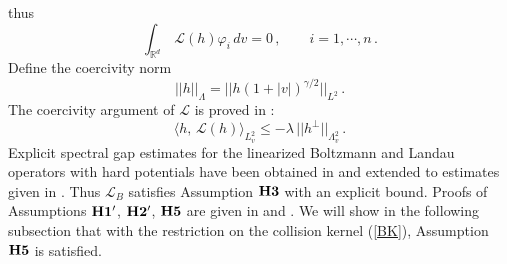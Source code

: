 \documentclass[final,onefignum,onetabnum]{siamart171218}
\begin{document}
thus \begin{equation}\label{LN} \int_{\mathbb R^d}\, \mathcal L(h) \varphi_i\, dv=0\,, \qquad i=1, \cdots, n\,.  \end{equation}
Define the coercivity norm $$||h||_{\Lambda}=||h(1+|v|)^{\gamma/2}||_{L^2}\,.$$
The coercivity argument of $\mathcal L$ is proved in \cite{MC}:
\begin{equation}
\label{CoerB} \langle h, \, \mathcal L(h)\rangle_{L^2_v}\leq -\lambda\, ||h^{\perp}||_{\Lambda_v^2}\,.
\end{equation}
Explicit spectral gap estimates for the linearized Boltzmann and Landau operators with hard potentials
have been obtained in \cite{BCM} and extended to estimates given in \cite{MC}.
Thus $\mathcal L_{B}$ satisfies Assumption $\bf{H3}$ with an explicit bound.
Proofs of Assumptions ${\bf H1^{\prime}}$, ${\bf H2^{\prime}}$, ${\bf H5}$ are given
in \cite{CN} and \cite{MB}. We will show in the following subsection that with the restriction on the collision kernel (\ref{BK}),
Assumption ${\bf H5}$ is satisfied.

\end{document}
